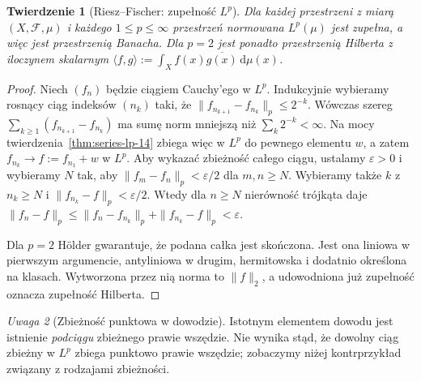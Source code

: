 \documentclass[11pt,a4paper,oneside]{book}
\numberwithin{equation}{chapter}
\theoremstyle{plain}
\newtheorem{twierdzenie}{Twierdzenie}[chapter]
\theoremstyle{definition}
\theoremstyle{remark}
\newtheorem{uwaga}[twierdzenie]{Uwaga}
\begin{document}
\begin{twierdzenie}[Riesz--Fischer: zupełność $L^p$]
\label{thm:riesz-fischer-14}
Dla każdej przestrzeni z miarą $(X,\mathcal F,\mu)$
i każdego $1\le p\le\infty$ przestrzeń normowana
$L^p(\mu)$ jest zupełna, a więc jest przestrzenią Banacha.
Dla $p=2$ jest ponadto przestrzenią Hilberta
z iloczynem skalarnym
$\langle f,g\rangle:=\int_X f(x)\overline{g(x)}\,\mathrm d\mu(x)$.
\end{twierdzenie}
\begin{proof}
Niech $(f_n)$ będzie ciągiem Cauchy'ego w $L^p$.
Indukcyjnie wybieramy rosnący ciąg indeksów $(n_k)$
taki, że $\|f_{n_{k+1}}-f_{n_k}\|_p\le2^{-k}$.
Wówczas szereg $\sum_{k\ge1}(f_{n_{k+1}}-f_{n_k})$
ma sumę norm mniejszą niż $\sum_k2^{-k}<\infty$.
Na mocy twierdzenia~\ref{thm:series-lp-14}
zbiega więc w $L^p$ do pewnego elementu $w$,
a zatem $f_{n_k}\to f:=f_{n_1}+w$ w $L^p$.
Aby wykazać zbieżność całego ciągu, ustalamy
$\varepsilon>0$ i wybieramy $N$ tak, aby
$\|f_m-f_n\|_p<\varepsilon/2$ dla $m,n\ge N$.
Wybieramy także $k$ z $n_k\ge N$ i
$\|f_{n_k}-f\|_p<\varepsilon/2$.
Wtedy dla $n\ge N$ nierówność trójkąta daje
$\|f_n-f\|_p\le\|f_n-f_{n_k}\|_p+
\|f_{n_k}-f\|_p<\varepsilon$.

Dla $p=2$ Hölder gwarantuje, że podana całka
jest skończona. Jest ona liniowa w pierwszym
argumencie, antyliniowa w drugim, hermitowska
i dodatnio określona na klasach. Wytworzona przez nią
norma to $\|f\|_2$, a udowodniona już zupełność
oznacza zupełność Hilberta.
\end{proof}

\begin{uwaga}[Zbieżność punktowa w dowodzie]
Istotnym elementem dowodu jest istnienie
\emph{podciągu} zbieżnego prawie wszędzie.
Nie wynika stąd, że dowolny ciąg zbieżny w $L^p$
zbiega punktowo prawie wszędzie; zobaczymy niżej
kontrprzykład związany z rodzajami zbieżności.
\end{uwaga}
\end{document}
